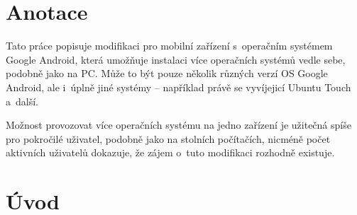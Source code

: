 \documentclass[12pt, a4paper, oneside]{article}
\begin{document}
\section*{Anotace}


Tato práce popisuje modifikaci pro mobilní zařízení s~operačním systémem Google Android, která umožňuje instalaci více operačních systémů vedle sebe, podobně jako na PC. Může to být pouze několik různých verzí OS Google Android, ale i~úplně jiné systémy -- například právě se vyvíjejicí Ubuntu Touch a~další.

Možnost provozovat více operačních systému na jedno zařízení je užitečná spíše pro pokročilé uživatel, podobně jako na stolních počítačích, nicméně počet aktivních uživatelů dokazuje, že zájem o~tuto modifikaci rozhodně existuje.

\addtolength{\textheight}{30mm} %

\newpage
\pagestyle{plain}

\setlength{\voffset}{-20mm} %
\setcounter{page}{1}  %

\tableofcontents  %

\addtolength{\textheight}{-30mm} %
\newpage
\setlength{\voffset}{0mm} %
\pagestyle{plain}

%
\section*{Úvod}
\label{uvod}
\end{document}
